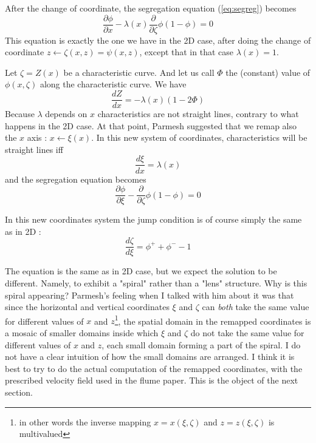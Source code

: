 \documentclass[11pt]{article}
\newcommand{\p}[2]{\ensuremath{\frac{\partial {#1}}{\partial {#2}}}}
\newcommand{\tot}[2]{\ensuremath{\frac{d {#1}}{d {#2}}}}
\newcommand{\z}{\ensuremath{\zeta}}
\newcommand{\x}{\ensuremath{\xi}}
\newcommand{\lam}{\ensuremath{\lambda}}
\begin{document}
After the change of coordinate, the segregation equation (\ref{eq:segreg}) becomes
\begin{equation}
	\p{\phi}{x} - \lam(x) \p{}{\z} \phi (1 - \phi) = 0
\end{equation}
This equation is exactly the one we have in the 2D case, after doing the change of coordinate $z \leftarrow \z(x,z)=\psi(x,z)$, except that in that case $\lam(x) = 1$.

Let $\z = Z(x)$ be a characteristic curve. And let us call $\Phi$ the (constant) value of  $\phi(x,\z)$ along the characteristic curve. We have
\begin{equation}
	\tot{Z}{x} = - \lam(x) ( 1 - 2 \Phi)
\end{equation}
Because $\lam$ depends on $x$ characteristics are not straight lines, contrary to what happens in the 2D case. 
At that point, Parmesh suggested that we remap also the $x$ axis : $x \leftarrow \x(x)$. 
In this new system of coordinates, characteristics will be straight lines iff
\begin{equation}
	\tot{\x}{x} = \lam(x)
\end{equation}
and the segregation equation becomes
\begin{equation}
	\p{\phi}{\x} - \p{}{\z} \phi (1 - \phi) = 0
\end{equation}

In this new coordinates system the jump condition is of course simply the same as in 2D :
\begin{equation}
	\tot{\z}{\x} = \phi^+ + \phi^-  - 1
\end{equation}

The equation is the same as in 2D case, but we expect the solution to be different. Namely, to exhibit a "spiral" rather than a "lens" structure. 
Why is this spiral appearing? Parmesh's feeling when I talked with him about it was that since the horizontal and vertical coordinates $\x$ and $\z$ can \textit{both} take the same value for different values of $x$ and $z$\footnote{in other words the inverse mapping $x = x(\x, \z)$ and $z = z(\x,\z)$ is multivalued}, the spatial domain in the remapped coordinates is a mosaic of smaller domains inside which $\x$ and $\z$ do not take the same value for different values of $x$ and $z$, each small domain forming a part of the spiral.
I do not have a clear intuition of how the small domains are arranged. I think it is best to try to do the actual computation of the remapped coordinates, with the prescribed velocity field used in the flume paper. This is the object of the next section.
\end{document}
